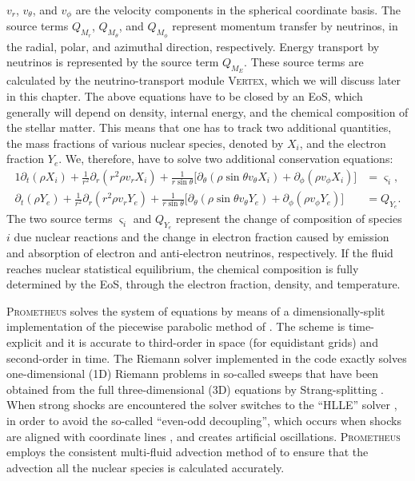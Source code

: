 $v_r$, $v_{\theta}$, and $v_{\phi}$ are the velocity components in the spherical
coordinate basis. The source terms $Q_{M_{r}}$, $Q_{M_{\theta}}$, and $Q_{M_{\phi}}$ represent
momentum transfer by neutrinos, in the radial, polar, and azimuthal direction, respectively.
Energy transport by neutrinos is represented by the source term $Q_{M_{E}}$. These source terms are calculated
by the neutrino-transport module \textsc{Vertex}, which we will discuss later in this chapter.
The above equations have to be closed by an EoS, which generally will depend on 
density, internal energy, and the chemical composition of the stellar matter.
This means that one has to track two additional quantities, the mass fractions
of various nuclear species, denoted by $X_i$, and the electron fraction $Y_e$. We, therefore,
have to solve two additional conservation equations:
\begin{alignat}{1}
\partial_t (\rho X_i) + \frac{1}{r^2} \partial_r (r^2 \rho v_r X_i) + \frac{1}{r \sin{\theta}} \bigg[ \partial_{\theta} (\rho \sin{\theta} v_{\theta} X_i) + \partial_{\phi} (\rho v_{\phi} X_i) \bigg] &= \varsigma_i, \label{eqN:contxi} \\
\partial_t (\rho Y_e) + \frac{1}{r^2} \partial_r (r^2 \rho v_r Y_e) + \frac{1}{r \sin{\theta}} \bigg[ \partial_{\theta} (\rho \sin{\theta} v_{\theta} Y_e) + \partial_{\phi} (\rho v_{\phi} Y_e) \bigg] &= Q_{Y_e}. \label{eqN:contye}
\end{alignat}
The two source terms $\varsigma_i$ and $Q_{Y_e}$ represent the change of composition of species $i$ due nuclear reactions
and the change in electron fraction caused by emission and absorption of electron and anti-electron neutrinos,
respectively. If the fluid reaches nuclear statistical equilibrium, the chemical 
composition is fully determined by the EoS, through the electron fraction, density, and
temperature.

\textsc{Prometheus} solves the system of equations
by means of a dimensionally-split implementation of the piecewise parabolic method of \cite{colella_84}.
The scheme is time-explicit and it is accurate to third-order in space (for equidistant grids) and second-order in time.
The Riemann solver implemented in the code exactly solves one-dimensional (1D) Riemann problems in so-called sweeps
that have been obtained from the full three-dimensional (3D) equations by Strang-splitting \citep{strang_68}.
When strong shocks are encountered the solver switches to the ``HLLE'' solver \citep{einfeldt_88},
in order to avoid the so-called ``even-odd decoupling'', which occurs
when shocks are aligned with coordinate lines \citep{quirk_94,kifonidis_03},
and creates artificial oscillations. \textsc{Prometheus} employs the 
consistent multi-fluid advection method of \cite{plewa_99} to ensure that the advection all the nuclear species
is calculated accurately.

